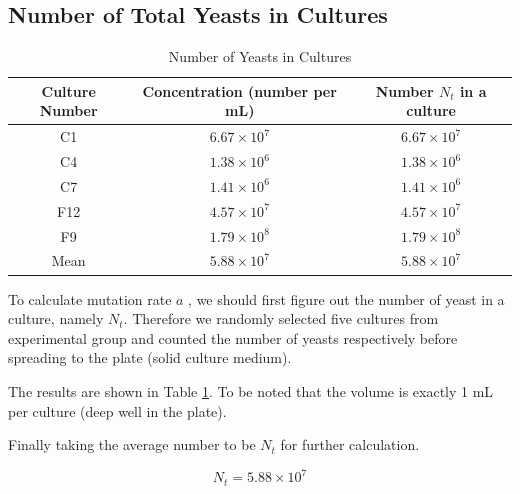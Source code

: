 \documentclass[UTF-8]{article}
\begin{document}
\subsection{Number of Total Yeasts in Cultures}
\begin{table}[h]
    \centering
    \begin{tabular}{|c|c|c|}\hline
        Culture Number & Concentration (number per mL)& Number $N_t$ in a culture\\ \hline
        C1 & $6.67\times 10^7$ & $6.67\times 10^7$\\ \hline
        C4 & $1.38\times 10^6$ & $1.38\times 10^6$\\ \hline
        C7 & $1.41\times 10^6$ & $1.41\times 10^6$\\ \hline
        F12 & $4.57\times 10^7$ & $4.57\times 10^7$\\ \hline
        F9 & $1.79\times 10^8$ & $1.79\times 10^8$\\ \hline
        Mean & $5.88\times 10^7$ & $5.88\times 10^7$\\ \hline
    \end{tabular}
    \caption{Number of Yeasts in Cultures}
    \label{Number of Yeasts in Cultures}
\end{table}

To calculate mutation rate $a$ , we should first figure out the number of yeast in a culture, namely $N_t$.
Therefore we randomly selected five cultures from experimental group and counted the number of yeasts respectively before spreading to the plate (solid culture medium).

The results are shown in Table \ref{Number of Yeasts in Cultures}.
To be noted that the volume is exactly 1 mL per culture (deep well in the plate).


Finally taking the average number to be $N_t$ for further calculation.

$$
N_t=5.88\times 10^7
$$
\end{document}
